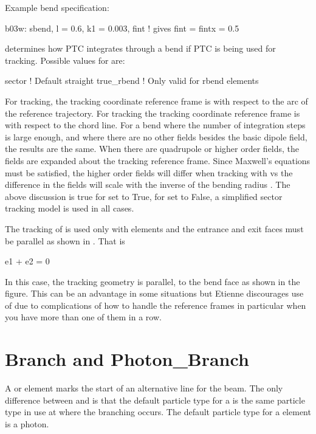 Example bend specification:
\begin{example}
  b03w: sbend, l = 0.6, k1 = 0.003, fint  ! gives fint = fintx = 0.5
\end{example}


 determines how PTC integrates through a bend
if PTC is being used for tracking. Possible values for
 are:
\begin{example}
  sector      ! Default
  straight
  true_rbend  ! Only valid for rbend elements
\end{example}
For  tracking, the tracking coordinate reference frame is
with respect to the arc of the reference trajectory. For 
tracking the tracking coordinate reference frame is with respect to the
chord line. For a bend where the number of integration steps is large
enough, and where there are no other fields besides the basic dipole
field, the results are the same.  When there are quadrupole or higher
order fields, the fields are expanded about the tracking reference
frame. Since Maxwell's equations must be satisfied, the higher order
fields will differ when tracking with  vs  the
difference in the fields will scale with the inverse of the bending
radius . The above discussion is true for
 set to True, for  set to
False, a simplified sector tracking model is used in all cases.

The  tracking of  is used only
with  elements and the entrance and exit faces must be parallel
as shown in . That is
\begin{example}
  e1 + e2 = 0
\end{example}
In this case, the tracking geometry is parallel, to the bend face as
shown in the figure. This can be an advantage in some situations but
Etienne discourages use of  due to complications of how
to handle the reference frames in particular when you have more than
one of them in a row.

\section{Branch and Photon_Branch}
\label{s:branch}

A  or  element marks the start of an
alternative line for the beam. The only difference between 
and  is that the default particle type for a
 is the same particle type in use at where the branching
occurs. The default particle type for a  element is
a photon.


